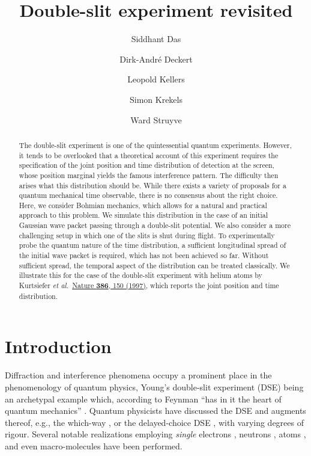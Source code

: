 \documentclass[11pt,a4paper]{article}
\begin{document}
\title{Double-slit experiment revisited}


\author[*]{Siddhant Das}
\author[*]{Dirk-Andr\'e Deckert}
\author[*]{Leopold Kellers}
\author[$\dagger$,$\ddag$]{Simon Krekels}
\author[$\dagger$,$\$$]{Ward Struyve}



\maketitle
\normalem

\begin{abstract}
The double-slit experiment is one of the quintessential quantum experiments. However, it tends to be overlooked that a theoretical account of this experiment requires the specification of the joint position and time distribution of detection at the screen, whose position marginal yields the famous interference pattern. The difficulty then arises what this distribution should be. While there exists a variety of proposals for a quantum mechanical time observable, there is no consensus about the right choice. Here, we consider Bohmian mechanics, which allows for a natural and practical approach to this problem. We simulate this distribution in the case of an initial Gaussian wave packet passing through a double-slit potential. We also consider a more challenging setup in which one of the slits is shut during flight. To experimentally probe the quantum nature of the time distribution, a sufficient longitudinal spread of the initial wave packet is required, which has not been achieved so far. Without sufficient spread, the temporal aspect of the distribution can be treated classically. We illustrate this for the case of the double-slit experiment with helium atoms by Kurtsiefer {\em et al.}\ \href{https://www.nature.com/articles/386150a0}{Nature \textbf{386}, 150 (1997)}, which reports the joint position and time distribution. 
\end{abstract}

\section{Introduction}
Diffraction and interference phenomena occupy a prominent place in the phenomenology of quantum physics, Young's double-slit experiment (DSE) being an archetypal example which, according to Feynman ``has in it the heart of quantum mechanics'' \cite{Feynman}. Quantum physicists have discussed the DSE and augments thereof, e.g., the which-way \cite{Zurek,WWM}, or the delayed-choice DSE \cite{Wheeler}, with varying degrees of rigour. Several notable realizations employing \emph{single} electrons \cite{Batelaan,tonomura}, neutrons \cite{neutronsA,neutronsB}, atoms \cite{atomDS,Pfau}, and even macro-molecules \cite{molecules} have been performed. 
\end{document}
